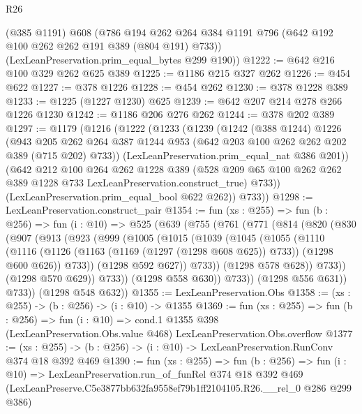 \begin{lexlean}{R26}
\begin{coremodule}
      (@385 @1191)
      @608
      (@786 @194 @262 @264 @384 @1191 @796 (@642 @192 @100 @262 @262 @191 @389 (@804 @191) @733))
      (LexLeanPreservation.prim_equal_bytes @299 @190))
@1222 := @642 @216 @100 @329 @262 @625 @389
@1225 := @1186 @215 @327 @262
@1226 := @454 @622
@1227 := @378 @1226
@1228 := @454 @262
@1230 := @378 @1228 @389
@1233 := @1225 (@1227 @1230) @625
@1239 := @642 @207 @214 @278 @266 @1226 @1230
@1242 := @1186 @206 @276 @262
@1244 := @378 @202 @389
@1297 := @1179
    (@1216
      (@1222
        (@1233
          (@1239
            (@1242
              (@388 @1244)
              @1226
              (@943
                @205
                @262
                @264
                @387
                @1244
                @953
                (@642 @203 @100 @262 @262 @202 @389 (@715 @202) @733))
              (LexLeanPreservation.prim_equal_nat @386 @201))
            (@642
              @212
              @100
              @264
              @262
              @1228
              @389
              (@528 @209 @65 @100 @262 @262 @389 @1228 @733 LexLeanPreservation.construct_true)
              @733))
          (LexLeanPreservation.prim_equal_bool @622 @262))
        @733))
@1298 := LexLeanPreservation.construct_pair
@1354 := fun (xs : @255) =>
  fun (b : @256) =>
  fun (i : @10) =>
  @525
    (@639
      (@755
        (@761
          (@771
            (@814
              (@820
                (@830
                  (@907
                    (@913
                      (@923
                        (@999
                          (@1005
                            (@1015
                              (@1039
                                (@1045
                                  (@1055
                                    (@1110
                                      (@1116
                                        (@1126
                                          (@1163 (@1169 (@1297 (@1298 @608 @625)) @733))
                                          (@1298 @600 @626))
                                        @733))
                                    (@1298 @592 @627))
                                  @733))
                              (@1298 @578 @628))
                            @733))
                        (@1298 @570 @629))
                      @733))
                  (@1298 @558 @630))
                @733))
            (@1298 @556 @631))
          @733))
      (@1298 @548 @632))
@1355 := LexLeanPreservation.Obs
@1358 := (xs : @255) -> (b : @256) -> (i : @10) -> @1355
@1369 := fun (xs : @255) =>
  fun (b : @256) =>
  fun (i : @10) =>
  cond.{1} @1355 @398 (LexLeanPreservation.Obs.value @468) LexLeanPreservation.Obs.overflow
@1377 := (xs : @255) -> (b : @256) -> (i : @10) -> LexLeanPreservation.RunConv @374 @18 @392 @469
@1390 := fun (xs : @255) =>
  fun (b : @256) =>
  fun (i : @10) =>
  LexLeanPreservation.run_of_funRel
    @374
    @18
    @392
    @469
    (LexLeanPreserve.C5e3877bb632fa9558ef79b1ff2104105.R26.__rel_0 @286 @299 @386)
\end{coremodule}
\end{lexlean}
